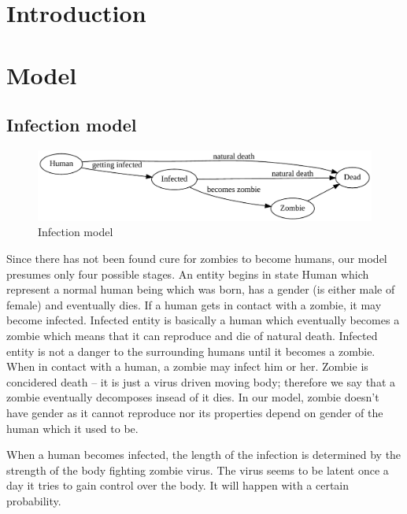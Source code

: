 \documentclass[a4paper]{article}
\title{\mytitle}
\author{\myauthor}
\begin{document}
\maketitle

\section{Introduction} %

\section{Model} %

\subsection{Infection model}

\begin{figure}[ht]
        \centering
        \includegraphics[width=\textwidth]{model}
        \caption{Infection model}
\end{figure}

Since there has not been found cure for zombies to become humans, our model presumes only four possible stages.
An entity begins in state Human which represent a normal human being which was born, has a gender (is either male of female) and eventually dies.
If a human gets in contact with a zombie, it may become infected.
Infected entity is basically a human which eventually becomes a zombie which means that it can reproduce and die of natural death.
Infected entity is not a danger to the surrounding humans until it becomes a zombie.
When in contact with a human, a zombie may infect him or her.
Zombie is concidered death -- it is just a virus driven moving body; therefore we say that a zombie eventually decomposes insead of it dies.
In our model, zombie doesn't have gender as it cannot reproduce nor its properties depend on gender of the human which it used to be.

When a human becomes infected, the length of the infection is determined by the strength of the body fighting zombie virus.
The virus seems to be latent once a day it tries to gain control over the body.
It will happen with a certain probability.
\end{document}
